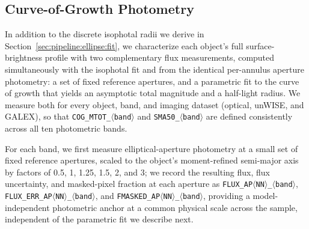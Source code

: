 \documentclass[modern,linenumbers]{aastex701}
\begin{document}
\subsection{Curve-of-Growth Photometry}
\label{sec:pipeline:cog}

In addition to the discrete isophotal radii we derive in
Section~\ref{sec:pipeline:ellipse:fit}, we characterize each object's
full surface-brightness profile with two complementary flux
measurements, computed simultaneously with the isophotal fit and from
the identical per-annulus aperture photometry: a set of fixed reference
apertures, and a parametric fit to the curve of growth that yields an
asymptotic total magnitude and a half-light radius. We measure both for
every object, band, and imaging dataset (optical, unWISE, and GALEX), so
that \texttt{COG\_MTOT\_$\langle$band$\rangle$} and
\texttt{SMA50\_$\langle$band$\rangle$} are defined consistently across
all ten photometric bands.

For each band, we first measure elliptical-aperture photometry at a
small set of fixed reference apertures, scaled to the object's
moment-refined semi-major axis by factors of 0.5, 1, 1.25, 1.5, 2, and
3; we record the resulting flux, flux uncertainty, and masked-pixel
fraction at each aperture as \texttt{FLUX\_AP$\langle$NN$\rangle$\_$\langle$band$\rangle$},
\texttt{FLUX\_ERR\_AP$\langle$NN$\rangle$\_$\langle$band$\rangle$}, and
\texttt{FMASKED\_AP$\langle$NN$\rangle$\_$\langle$band$\rangle$}, providing a
model-independent photometric anchor at a common physical scale across
the sample, independent of the parametric fit we describe next.
\end{document}
